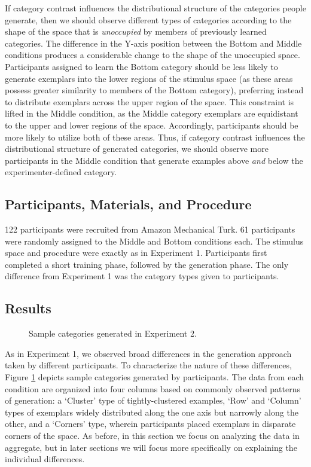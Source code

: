 \documentclass[12pt]{article}
\newcommand\inputpgf[2]{{
\let\pgfimageWithoutPath\pgfimage
\renewcommand{\pgfimage}[2][]{\pgfimageWithoutPath[##1]{#1/##2}}

}}
\begin{document}
\begin{flushleft}
If category contrast influences the distributional structure of the categories
people generate, then we should observe different types of categories according
to the shape of the space that is {\em unoccupied} by members of previously
learned categories. The difference in the Y-axis position between the Bottom and
Middle conditions produces a considerable change to the shape of the unoccupied
space. Participants assigned to learn the Bottom category should be less likely
to generate exemplars into the lower regions of the stimulus space (as these
areas possess greater similarity to members of the Bottom category), preferring
instead to distribute exemplars across the upper region of the space. This
constraint is lifted in the Middle condition, as the Middle category exemplars
are equidistant to the upper and lower regions of the space. Accordingly,
participants should be more likely to utilize both of these areas. Thus, if
category contrast influences the distributional structure of generated
categories, we should observe more participants in the Middle condition that
generate examples above {\em and} below the experimenter-defined category.


\subsection{Participants, Materials, and Procedure}

122 participants were recruited from Amazon Mechanical Turk. 61 participants
were randomly assigned to the Middle and Bottom conditions each. The stimulus
space and procedure were exactly as in Experiment 1. Participants first
completed a short training phase, followed by the generation phase. The only
difference from Experiment 1 was the category types given to participants.


\subsection{Results}

\begin{figure}
    \begin{center} \inputpgf{figs/}{e2-samples.pgf}
    \caption{Sample categories generated in Experiment 2. }
    \label{fig:e2-samples}
    \end{center}
\end{figure}


As in Experiment 1, we observed broad differences in the generation approach
taken by different participants. To characterize the nature of these
differences, Figure \ref{fig:e2-samples} depicts sample categories generated by
participants. The data from each condition are organized into four columns based
on commonly observed patterns of generation: a `Cluster' type of
tightly-clustered examples, `Row' and `Column' types of exemplars widely
distributed along the one axis but narrowly along the other, and a `Corners'
type, wherein participants placed exemplars in disparate corners of the space.
As before, in this section we focus on analyzing the data in aggregate, but in
later sections we will focus more specifically on explaining the individual
differences.


\end{flushleft}
\end{document}
